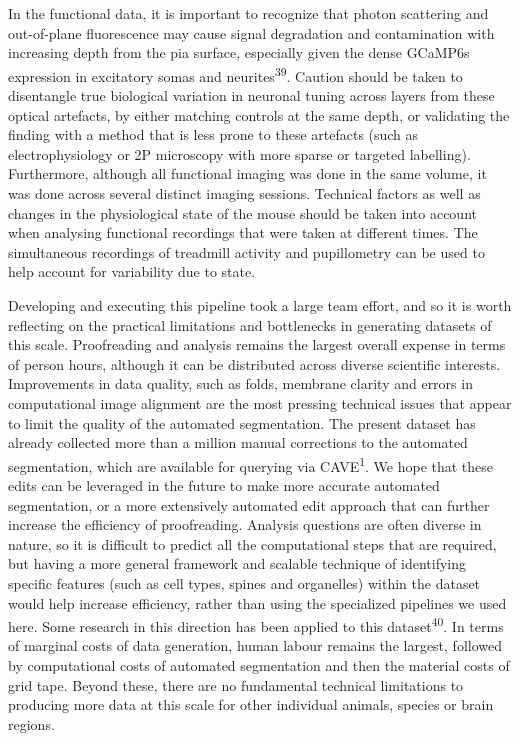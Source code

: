 \documentclass{article}
\begin{document}
In the functional data, it is important to recognize that photon scattering and out-of-plane fluorescence may cause signal degradation and contamination with increasing depth from the pia surface, especially given the dense GCaMP6s expression in excitatory somas and neurites\textsuperscript{39}. Caution should be taken to disentangle true biological variation in neuronal tuning across layers from these optical artefacts, by either matching controls at the same depth, or validating the finding with a method that is less prone to these artefacts (such as electrophysiology or 2P microscopy with more sparse or targeted labelling). Furthermore, although all functional imaging was done in the same volume, it was done across several distinct imaging sessions. Technical factors as well as changes in the physiological state of the mouse should be taken into account when analysing functional recordings that were taken at different times. The simultaneous recordings of treadmill activity and pupillometry can be used to help account for variability due to state.

Developing and executing this pipeline took a large team effort, and so it is worth reflecting on the practical limitations and bottlenecks in generating datasets of this scale. Proofreading and analysis remains the largest overall expense in terms of person hours, although it can be distributed across diverse scientific interests. Improvements in data quality, such as folds, membrane clarity and errors in computational image alignment are the most pressing technical issues that appear to limit the quality of the automated segmentation. The present dataset has already collected more than a million manual corrections to the automated segmentation, which are available for querying via CAVE\textsuperscript{1}. We hope that these edits can be leveraged in the future to make more accurate automated segmentation, or a more extensively automated edit approach that can further increase the efficiency of proofreading. Analysis questions are often diverse in nature, so it is difficult to predict all the computational steps that are required, but having a more general framework and scalable technique of identifying specific features (such as cell types, spines and organelles) within the dataset would help increase efficiency, rather than using the specialized pipelines we used here. Some research in this direction has been applied to this dataset\textsuperscript{40}. In terms of marginal costs of data generation, human labour remains the largest, followed by computational costs of automated segmentation and then the material costs of grid tape. Beyond these, there are no fundamental technical limitations to producing more data at this scale for other individual animals, species or brain regions.
\end{document}
